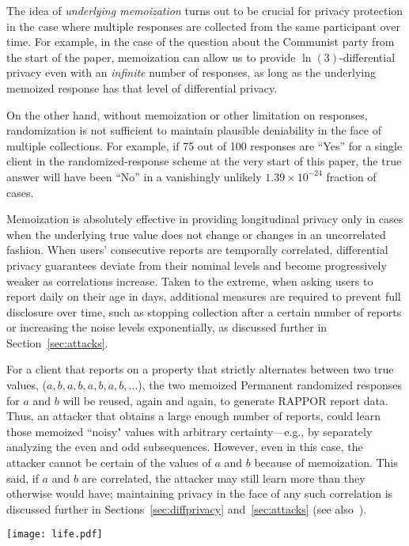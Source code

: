 \documentclass{sig-alternate-2013}
\newcommand\RAPPOR{{RAPPOR}}
\begin{document}
The idea of \emph{underlying memoization} turns out to be crucial for privacy protection in the case where multiple responses are collected from the same participant over time. For example, in the case of the question about the Communist party from the start of the paper, memoization can allow us to provide $\ln(3)$-differential privacy even with an \emph{infinite} number of responses, as long as the underlying memoized response has that level of differential privacy.

On the other hand,
without memoization or other limitation on responses,
randomization is not sufficient to
maintain plausible deniability
in the face of multiple collections.
For example,
if 75 out of 100 responses are ``Yes'' for a single client
in the randomized-response scheme
at the very start of this paper,
the true answer will have been ``No''
in a vanishingly unlikely $1.39 \times 10^{-24}$
fraction of cases.


Memoization is absolutely effective in providing longitudinal privacy only in cases when the underlying true value does not change
 or changes in an uncorrelated fashion. When users' consecutive reports are temporally correlated, differential privacy guarantees
 deviate from their nominal levels and become progressively weaker as correlations increase. Taken to the extreme, when asking users
 to report daily on their age in days, additional measures are required to prevent full disclosure over time, such as stopping collection after
 a certain number of reports or increasing the noise levels exponentially, 
as discussed further in Section~\ref{sec:attacks}.
 
For a client that reports on a property that strictly alternates between two true values, ($a, b, a, b, a, b, a, b, \ldots$), the two memoized Permanent randomized
 responses for $a$ and $b$ will be reused, again and again, to generate \RAPPOR{} report data. Thus, an attacker that obtains a large enough number of reports,
 could learn those memoized ``noisy" values with arbitrary certainty---e.g.,
 by separately analyzing the even and odd subsequences.
However, even in this case, 
the attacker cannot be certain of the values of $a$ and $b$
because of memoization.
This said,
if $a$ and $b$ are correlated,
the attacker may still learn more
than they otherwise would have;
maintaining privacy in the face of 
any such correlation 
is discussed further in Sections~\ref{sec:diffprivacy} and~\ref{sec:attacks} (see also~\cite{KiferM11}).

\begin{figure*}[!t]
\centering
\texttt{[image: life.pdf]}
\caption{Life of a \RAPPOR{} report: The client value of the string ``The number 68'' is hashed onto the Bloom filter $B$ using $h$ (here 4) hash functions. For this string, a Permanent randomized response $B'$ is produces and memoized by the client, and this $B'$ is used (and reused in the future) to generate Instantaneous randomized responses $S$ (the bottom row), which are sent to the collecting service.}\vspace*{-2ex}
\label{fig:life}
\end{figure*}
\end{document}
